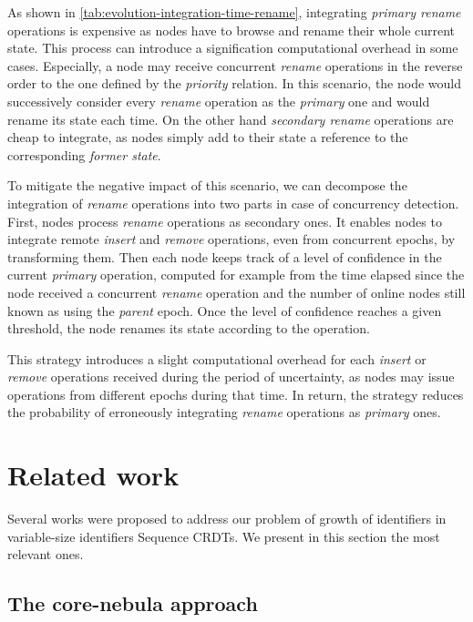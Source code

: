 \documentclass[10pt,journal,compsoc]{IEEEtran}
\begin{document}
As shown in \autoref{tab:evolution-integration-time-rename}, integrating \emph{primary rename} operations is expensive as nodes have to browse and rename their whole current state.
This process can introduce a signification computational overhead in some cases.
Especially, a node may receive concurrent \emph{rename} operations in the reverse order to the one defined by the \emph{priority} relation.
In this scenario, the node would successively consider every \emph{rename} operation as the \emph{primary} one and would rename its state each time.
On the other hand \emph{secondary rename} operations are cheap to integrate, as nodes simply add to their state a reference to the corresponding \emph{former state}.

To mitigate the negative impact of this scenario, we can decompose the integration of \emph{rename} operations into two parts in case of concurrency detection.
First, nodes process \emph{rename} operations as secondary ones.
It enables nodes to integrate remote \emph{insert} and \emph{remove} operations, even from concurrent epochs, by transforming them.
Then each node keeps track of a level of confidence in the current \emph{primary} operation, computed for example from the time elapsed since the node received a concurrent \emph{rename} operation and the number of online nodes still known as using the \emph{parent} epoch.
Once the level of confidence reaches a given threshold, the node renames its state according to the operation.

This strategy introduces a slight computational overhead for each \emph{insert} or \emph{remove} operations received during the period of uncertainty, as nodes may issue operations from different epochs during that time.
In return, the strategy reduces the probability of erroneously integrating \emph{rename} operations as \emph{primary} ones.

\section{Related work}

Several works were proposed to address our problem of growth of identifiers in variable-size identifiers Sequence \acp{CRDT}.
We present in this section the most relevant ones.

\subsection{The core-nebula approach}
\end{document}
